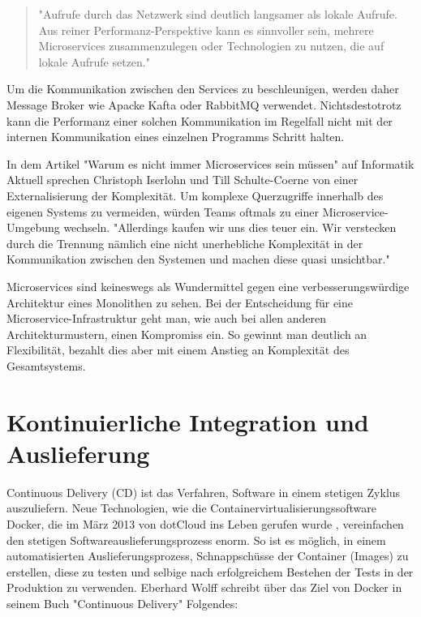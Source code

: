 \begin{quote}
"Aufrufe durch das Netzwerk sind deutlich langsamer als lokale Aufrufe.
Aus reiner Performanz-Perspektive kann es sinnvoller sein, mehrere Microservices
zusammenzulegen oder Technologien zu nutzen, die auf lokale Aufrufe setzen."\cite[S. 65, 3. Absatz]{MicroservicesBook}
\end{quote}

Um die Kommunikation zwischen den Services zu beschleunigen, werden daher Message Broker wie
Apacke Kafta oder RabbitMQ verwendet. Nichtsdestotrotz kann die Performanz einer solchen
Kommunikation im Regelfall nicht mit der internen Kommunikation eines einzelnen Programms Schritt halten.

In dem Artikel "Warum es nicht immer Microservices sein müssen" auf Informatik Aktuell
sprechen Christoph Iserlohn und Till Schulte-Coerne von einer Externalisierung der Komplexität.
Um komplexe Querzugriffe innerhalb des eigenen Systems zu vermeiden, würden Teams oftmals 
zu einer Microservice-Umgebung wechseln. "Allerdings kaufen wir uns dies teuer ein.
Wir verstecken durch die Trennung nämlich eine nicht unerhebliche Komplexität in
der Kommunikation zwischen den Systemen und machen diese quasi unsichtbar."\cite[Paragraph 11]{InformatikAktuellWarumNichtImmerMicroservices}

Microservices sind keineswegs als Wundermittel gegen eine verbesserungswürdige Architektur eines
Monolithen zu sehen. Bei der Entscheidung für eine Microservice-Infrastruktur geht man, wie
auch bei allen anderen Architekturmustern, einen Kompromiss ein. So gewinnt man deutlich
an Flexibilität, bezahlt dies aber mit einem Anstieg an Komplexität des Gesamtsystems.

\section{Kontinuierliche Integration und Auslieferung}
\label{sec:kontinuierlicheintegrationundauslieferung}
Continuous Delivery (CD) ist das Verfahren, Software in einem stetigen Zyklus auszuliefern.
Neue Technologien, wie die Containervirtualisierungssoftware Docker,
die im März 2013 von dotCloud ins Leben gerufen wurde \cite{DockerAbout2014}, vereinfachen
den stetigen Softwareauslieferungsprozess enorm. So ist es möglich, in einem automatisierten
Auslieferungsprozess, Schnappschüsse der Container (Images) zu erstellen, diese zu testen und selbige nach erfolgreichem
Bestehen der Tests in der Produktion zu verwenden. Eberhard Wolff schreibt über das Ziel von Docker in
seinem Buch "Continuous Delivery" Folgendes:

